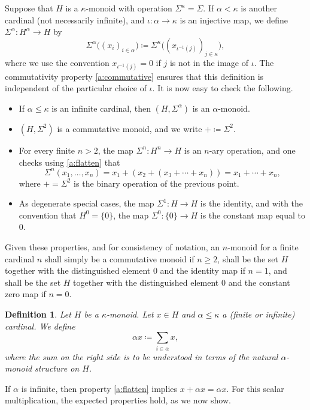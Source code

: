\documentclass[a4paper,11pt,oneside]{amsart}
\newtheorem{defi}[teor]{Definition}
\theoremstyle{remark}
\begin{document}
Suppose that $H$ is a $\kappa$-monoid with operation $\Sigma^\kappa=\Sigma$.
If $\alpha < \kappa$ is another cardinal (not necessarily infinite), and $\iota \colon \alpha \to \kappa$ is an injective map, we define $\Sigma^\alpha \colon H^\alpha \to H$ by
\[
  \Sigma^\alpha\big( (x_i)_{i \in \alpha} \big) \coloneqq \Sigma^\kappa\big( (x_{\iota^{-1}(j)})_{j \in \kappa} \big),
\]
where we use the convention $x_{\iota^{-1}(j)}=0$ if $j$ is not in the image of $\iota$.
The commutativity property \ref{a:commutative} ensures that this definition is independent of the particular choice of $\iota$.
It is now easy to check the following.

\begin{itemize}
\item If $\alpha \le \kappa$ is an infinite cardinal, then $(H, \Sigma^\alpha)$ is an $\alpha$-monoid.
\item $(H,\Sigma^2)$ is a commutative monoid, and we write $+ \coloneqq \Sigma^2$.
\item For every finite $n > 2$, the map $\Sigma^n \colon H^n \to H$ is an $n$-ary operation, and one checks using \ref{a:flatten} that
  \[
    \Sigma^n(x_1,\ldots,x_n) = x_1 + (x_2 + (x_3 + \cdots + x_n)) = x_1 + \cdots + x_n,
  \]
  where $+=\Sigma^2$ is the binary operation of the previous point.
\item As degenerate special cases, the map $\Sigma^1 \colon H \to H$ is the identity, and with the convention that $H^0=\{0\}$, the map $\Sigma^0 \colon \{0\} \to H$ is the constant map equal to $0$.
\end{itemize}

Given these properties, and for consistency of notation, an $n$-monoid for a finite cardinal $n$ shall simply be a commutative monoid if $n \ge 2$, shall be the set $H$ together with the distinguished element $0$ and the identity map if $n=1$, and shall be the set $H$ together with the distinguished element $0$ and the constant zero map if $n=0$.

\begin{defi}
  Let $H$ be a $\kappa$-monoid.
  Let $x \in H$ and $\alpha \leq \kappa$ a \textup(finite or infinite\textup) cardinal.
  We define
  \[
    \alpha x \coloneqq \sum_{i \in \alpha} x,
  \]
  where the sum on the right side is to be understood in terms of the natural $\alpha$-monoid structure on $H$.
\end{defi}

If $\alpha$ is infinite, then property \ref{a:flatten} implies $x + \alpha x  =  \alpha x $.
For this scalar multiplication, the expected properties hold, as we now show.
\end{document}
